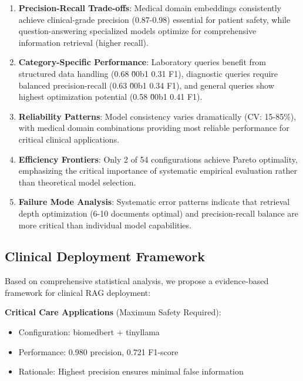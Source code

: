 \begin{enumerate}
    \item \textbf{Precision-Recall Trade-offs}: Medical domain embeddings consistently achieve clinical-grade precision (0.87-0.98) essential for patient safety, while question-answering specialized models optimize for comprehensive information retrieval (higher recall).

    \item \textbf{Category-Specific Performance}: Laboratory queries benefit from structured data handling (0.68 \u00b1 0.31 F1), diagnostic queries require balanced precision-recall (0.63 \u00b1 0.34 F1), and general queries show highest optimization potential (0.58 \u00b1 0.41 F1).

    \item \textbf{Reliability Patterns}: Model consistency varies dramatically (CV: 15-85\%), with medical domain combinations providing most reliable performance for critical clinical applications.

    \item \textbf{Efficiency Frontiers}: Only 2 of 54 configurations achieve Pareto optimality, emphasizing the critical importance of systematic empirical evaluation rather than theoretical model selection.

    \item \textbf{Failure Mode Analysis}: Systematic error patterns indicate that retrieval depth optimization (6-10 documents optimal) and precision-recall balance are more critical than individual model capabilities.
\end{enumerate}

\subsection{Clinical Deployment Framework}

Based on comprehensive statistical analysis, we propose a evidence-based framework for clinical RAG deployment:

\textbf{Critical Care Applications} (Maximum Safety Required):
\begin{itemize}
    \item Configuration: biomedbert + tinyllama
    \item Performance: 0.980 precision, 0.721 F1-score
    \item Rationale: Highest precision ensures minimal false information
\end{itemize}

